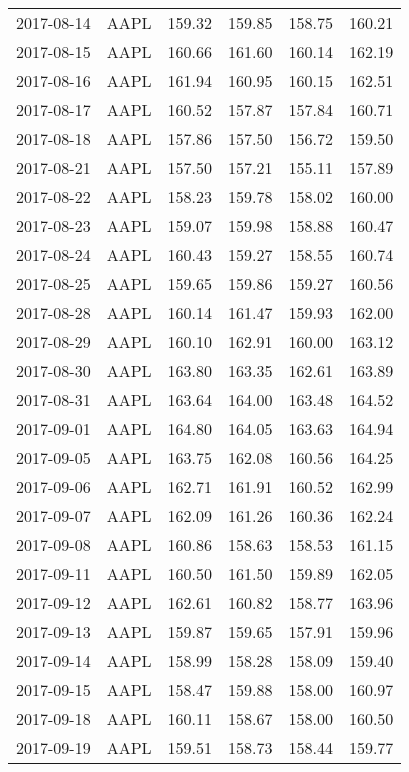 \documentclass[a4paper, 12pt]{report}
\begin{document}
\begin{appendices}
\begin{longtable}{llllll}
  2017-08-14 & AAPL & 159.32 & 159.85 & 158.75 & 160.21 \\ 
  2017-08-15 & AAPL & 160.66 & 161.60 & 160.14 & 162.19 \\ 
  2017-08-16 & AAPL & 161.94 & 160.95 & 160.15 & 162.51 \\ 
  2017-08-17 & AAPL & 160.52 & 157.87 & 157.84 & 160.71 \\ 
  2017-08-18 & AAPL & 157.86 & 157.50 & 156.72 & 159.50 \\ 
  2017-08-21 & AAPL & 157.50 & 157.21 & 155.11 & 157.89 \\ 
  2017-08-22 & AAPL & 158.23 & 159.78 & 158.02 & 160.00 \\ 
  2017-08-23 & AAPL & 159.07 & 159.98 & 158.88 & 160.47 \\ 
  2017-08-24 & AAPL & 160.43 & 159.27 & 158.55 & 160.74 \\ 
  2017-08-25 & AAPL & 159.65 & 159.86 & 159.27 & 160.56 \\ 
  2017-08-28 & AAPL & 160.14 & 161.47 & 159.93 & 162.00 \\ 
  2017-08-29 & AAPL & 160.10 & 162.91 & 160.00 & 163.12 \\ 
  2017-08-30 & AAPL & 163.80 & 163.35 & 162.61 & 163.89 \\ 
  2017-08-31 & AAPL & 163.64 & 164.00 & 163.48 & 164.52 \\ 
  2017-09-01 & AAPL & 164.80 & 164.05 & 163.63 & 164.94 \\ 
  2017-09-05 & AAPL & 163.75 & 162.08 & 160.56 & 164.25 \\ 
  2017-09-06 & AAPL & 162.71 & 161.91 & 160.52 & 162.99 \\ 
  2017-09-07 & AAPL & 162.09 & 161.26 & 160.36 & 162.24 \\ 
  2017-09-08 & AAPL & 160.86 & 158.63 & 158.53 & 161.15 \\ 
  2017-09-11 & AAPL & 160.50 & 161.50 & 159.89 & 162.05 \\ 
  2017-09-12 & AAPL & 162.61 & 160.82 & 158.77 & 163.96 \\ 
  2017-09-13 & AAPL & 159.87 & 159.65 & 157.91 & 159.96 \\ 
  2017-09-14 & AAPL & 158.99 & 158.28 & 158.09 & 159.40 \\ 
  2017-09-15 & AAPL & 158.47 & 159.88 & 158.00 & 160.97 \\ 
  2017-09-18 & AAPL & 160.11 & 158.67 & 158.00 & 160.50 \\ 
  2017-09-19 & AAPL & 159.51 & 158.73 & 158.44 & 159.77 \\ 

\end{longtable}
\end{appendices}
\end{document}
